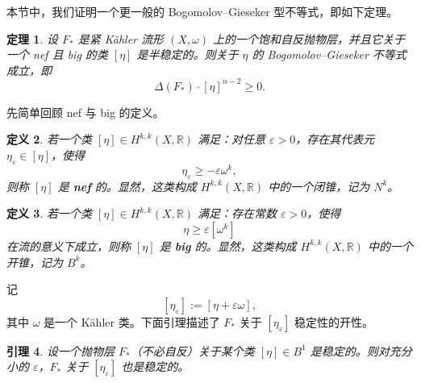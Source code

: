 \documentclass[12pt,a4paper]{article}
\newtheorem{theorem}{定理}[section]
\newtheorem{lemma}[theorem]{引理}
\newtheorem{definition}[theorem]{定义}
\begin{document}
本节中，我们证明一个更一般的 Bogomolov--Gieseker 型不等式，即如下定理。

\begin{theorem}
设 \(F_*\) 是紧 Kähler 流形 \((X,\omega)\) 上的一个饱和自反抛物层，并且它关于一个 nef 且 big 的类 \([\eta]\) 是半稳定的。则关于 \(\eta\) 的 Bogomolov--Gieseker 不等式成立，即
\[
\Delta(F_*)\cdot [\eta]^{n-2}\ge 0.
\]
\end{theorem}

先简单回顾 nef 与 big 的定义。

\begin{definition}
若一个类 \([\eta]\in H^{k,k}(X,\mathbb R)\) 满足：对任意 \(\varepsilon>0\)，存在其代表元 \(\eta_\varepsilon\in [\eta]\)，使得
\[
\eta_\varepsilon\ge -\varepsilon \omega^k,
\]
则称 \([\eta]\) 是 \textbf{nef} 的。显然，这类构成 \(H^{k,k}(X,\mathbb R)\) 中的一个闭锥，记为 \(N^k\)。
\end{definition}

\begin{definition}
若一个类 \([\eta]\in H^{k,k}(X,\mathbb R)\) 满足：存在常数 \(\varepsilon>0\)，使得
\[
\eta\ge \varepsilon[\omega^k]
\]
在流的意义下成立，则称 \([\eta]\) 是 \textbf{big} 的。显然，这类构成 \(H^{k,k}(X,\mathbb R)\) 中的一个开锥，记为 \(B^k\)。
\end{definition}

记
\[
[\eta_\varepsilon]:=[\eta+\varepsilon\omega],
\]
其中 \(\omega\) 是一个 Kähler 类。下面引理描述了 \(F_*\) 关于 \([\eta_\varepsilon]\) 稳定性的开性。

\begin{lemma}
设一个抛物层 \(F_*\)（不必自反）关于某个类 \([\eta]\in B^1\) 是稳定的。则对充分小的 \(\varepsilon\)，\(F_*\) 关于 \([\eta_\varepsilon]\) 也是稳定的。
\end{lemma}
\end{document}
